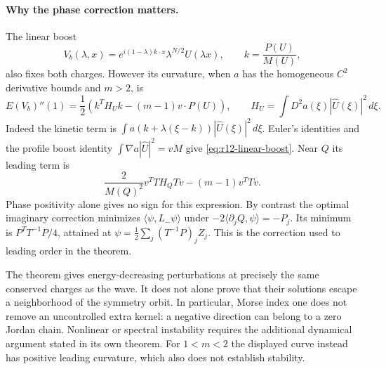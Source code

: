 \paragraph{Why the phase correction matters.}
The linear boost
\[
 V_b(\lambda,x)=e^{i(1-\lambda)k\cdot x}
                  \lambda^{N/2}U(\lambda x),\qquad
 k=\frac{P(U)}{M(U)},
\]
also fixes both charges. However its curvature, when $a$ has the
homogeneous $C^2$ derivative bounds and $m>2$, is
\begin{equation}\label{eq:r12-linear-boost}
 E(V_b)''(1)=\frac12\left(k^TH_Uk-(m-1)v\cdot P(U)\right),
 \qquad H_U=\int D^2a(\xi)|\widehat U(\xi)|^2\,d\xi.
\end{equation}
Indeed the kinetic term is
$\int a(k+\lambda(\xi-k))|\widehat U(\xi)|^2\,d\xi$.
Euler's identities and the profile boost identity
$\int\nabla a|\widehat U|^2=vM$ give
\eqref{eq:r12-linear-boost}. Near $Q$ its leading term is
\[
 \frac{2}{M(Q)^2}v^TTH_QTv-(m-1)v^TTv.
\]
Phase positivity alone gives no sign for this expression.
By contrast the optimal imaginary correction minimizes
$\langle\psi,L_-\psi\rangle$ under
$-2\langle\partial_jQ,\psi\rangle=-P_j$. Its minimum is
$P^TT^{-1}P/4$, attained at
$\psi=\frac12\sum_j(T^{-1}P)_jZ_j$.
This is the correction used to leading order in the theorem.

\begin{remark}
The theorem gives energy-decreasing perturbations at precisely the same
conserved charges as the wave. It does not alone prove that their
solutions escape a neighborhood of the symmetry orbit. In particular,
Morse index one does not remove an uncontrolled extra kernel: a negative
direction can belong to a zero Jordan chain. Nonlinear or spectral
instability requires the additional dynamical argument stated in its
own theorem. For $1<m<2$ the displayed curve instead has positive
leading curvature, which also does not establish stability.
\end{remark}
